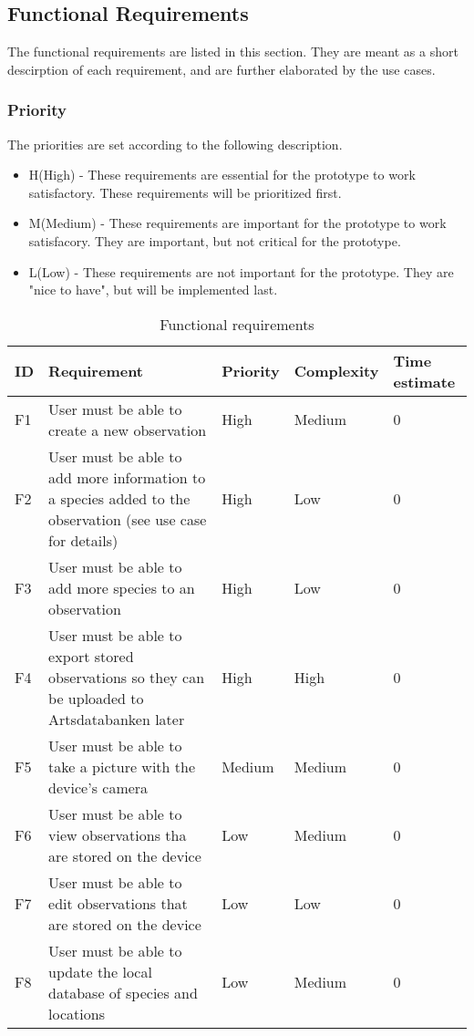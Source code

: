 \subsection{Functional Requirements}
The functional requirements are listed in this section. They are meant as a short descirption of each requirement, and are further elaborated by the use cases.

\subsubsection{Priority}
The priorities are set according to the following description.
\begin{itemize}
	 \item H(High) - These requirements are essential for the prototype to work satisfactory. These requirements will be prioritized first.
	\item M(Medium) - These requirements are important for the prototype to work satisfacory. They are important, but not critical for the prototype.
	\item L(Low) - These requirements are not important for the prototype. They are "nice to have", but will be implemented last.
\end{itemize}

\begin{table}[h!]
	\begin{tabular}[t]{|l|p{}|l|l|p{}|}\hline
	\bf ID&\bf Requirement& \bf Priority& \bf Complexity&\bf Time estimate\\\hline
	F1&User must be able to create a new observation &High&Medium&0\\\hline
	F2&User must be able to add more information to a species added to the observation (see use case for details) 	&High&Low&0\\\hline
	F3&User must be able to add more species to an observation &High&Low&0\\\hline
	F4&User must be able to export stored observations so they can be uploaded to Artsdatabanken later &High&High&0\\\hline
	F5&User must be able to take a picture with the device's camera &Medium&Medium&0\\\hline
	F6&User must be able to view observations tha are stored on the device &Low&Medium&0\\\hline
	F7&User must be able to edit observations that are stored on the device &Low&Low&0\\\hline
	F8&User must be able to update the local database of species and locations &Low&Medium&0\\\hline
	\end{tabular}
	\caption{Functional requirements}
	\label{funcreqs}
\end{table}
